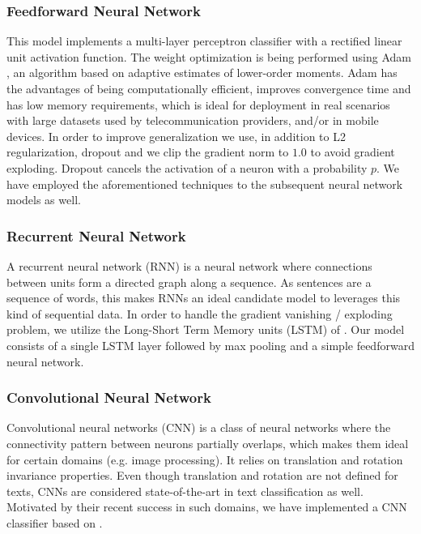 \documentclass[letterpaper]{article}
\begin{document}
\subsubsection{Feedforward Neural Network}  \label{Feedforward Neural Network}

This model implements a multi-layer perceptron classifier with a rectified linear unit activation function. The weight optimization is being performed using Adam \cite{DBLP:journals/corr/KingmaB14}, an algorithm based on adaptive estimates of lower-order moments. Adam has the advantages of being computationally efficient, improves convergence time and has low memory requirements, which is ideal for deployment in real scenarios with large datasets used by telecommunication providers, and/or in mobile devices. In order to improve generalization we use, in addition to L2 regularization, dropout \cite{Srivastava2014} and we clip the gradient norm to $1.0$ to avoid gradient exploding. Dropout cancels the activation of a neuron with a probability $p$. We have employed the aforementioned techniques to the subsequent neural network models as well.

\subsubsection{Recurrent Neural Network} \label{Recurrent Neural Network}

A recurrent neural network (RNN) is a neural network where connections between units form a directed graph along a sequence. As sentences are a sequence of words, this makes RNNs an ideal candidate model to leverages this kind of sequential data. In order to handle the gradient vanishing / exploding problem, we utilize the Long-Short Term Memory units (LSTM) of \cite{hochreiter1997long}. Our model consists of a single LSTM layer followed by max pooling and a simple feedforward neural network.

\subsubsection{Convolutional Neural Network} \label{Convolutional Neural Network}

Convolutional neural networks (CNN) is a class of neural networks where the connectivity pattern between neurons partially overlaps, which makes them ideal for certain domains (e.g. image processing). It relies on translation and rotation invariance properties. Even though translation and rotation are not defined for texts, CNNs are considered state-of-the-art in text classification \cite{CaoLLW17} \cite{kim2014convolutional} \cite{zhang2015understanding} \cite{XiaoC16} as well. Motivated by their recent success in such domains, we have implemented a CNN classifier based on \cite{kim2014convolutional}.
\end{document}
